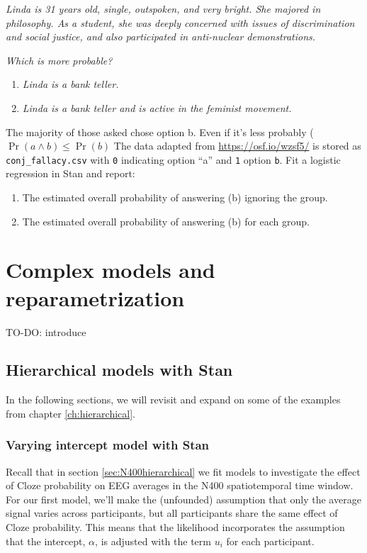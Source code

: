 \documentclass[12pt,]{krantz}
\providecommand{\tightlist}{%
  \setlength{\itemsep}{0pt}\setlength{\parskip}{0pt}}
\theoremstyle{definition}
\theoremstyle{definition}
\theoremstyle{definition}
\theoremstyle{remark}
\begin{document}
\emph{Linda is 31 years old, single, outspoken, and very bright. She
majored in philosophy. As a student, she was deeply concerned with
issues of discrimination and social justice, and also participated in
anti-nuclear demonstrations.}

\emph{Which is more probable?}

\begin{enumerate}
\def\labelenumi{\alph{enumi}.}
\tightlist
\item
  \emph{Linda is a bank teller.}
\item
  \emph{Linda is a bank teller and is active in the feminist movement.}
\end{enumerate}

The majority of those asked chose option b. Even if it's less probably
(\(\Pr(a\land b)\leq \Pr(b)\) The data adapted from
\url{https://osf.io/wzsf5/} is stored as \texttt{conj\_fallacy.csv} with
\texttt{0} indicating option ``a'' and \texttt{1} option \texttt{b}. Fit
a logistic regression in Stan and report:

\begin{enumerate}
\def\labelenumi{\alph{enumi}.}
\tightlist
\item
  The estimated overall probability of answering (b) ignoring the group.
\item
  The estimated overall probability of answering (b) for each group.
\end{enumerate}

\chapter{Complex models and reparametrization}\label{ch:complexstan}

TO-DO: introduce

\section{Hierarchical models with
Stan}\label{hierarchical-models-with-stan}

In the following sections, we will revisit and expand on some of the
examples from chapter \ref{ch:hierarchical}.

\subsection{Varying intercept model with
Stan}\label{varying-intercept-model-with-stan}

Recall that in section \ref{sec:N400hierarchical} we fit models to
investigate the effect of Cloze probability on EEG averages in the N400
spatiotemporal time window. For our first model, we'll make the
(unfounded) assumption that only the average signal varies across
participants, but all participants share the same effect of Cloze
probability. This means that the likelihood incorporates the assumption
that the intercept, \(\alpha\), is adjusted with the term \(u_i\) for
each participant.
\end{document}
